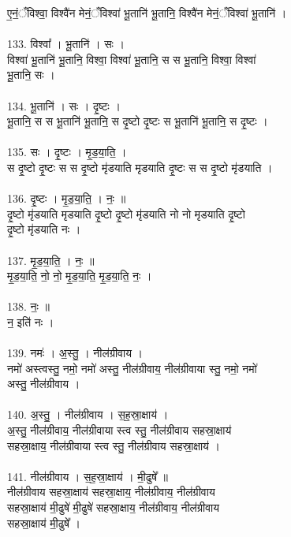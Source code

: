ए॒नं॒ँविश्वा॒ विश्वै॑न मेनं॒ँविश्वा॑ भू॒तानि॑ भू॒तानि॒ विश्वै॑न मेनं॒ँविश्वा॑ भू॒तानि॑ ।\\
\\
133. विश्वा᳚ । भू॒तानि॑ । सः ।\\
विश्वा॑ भू॒तानि॑ भू॒तानि॒ विश्वा॒ विश्वा॑ भू॒तानि॒ स स भू॒तानि॒ विश्वा॒ विश्वा॑\\
भू॒तानि॒ सः ।\\
\\
134. भू॒तानि॑ । सः । दृ॒ष्टः ।\\
भू॒तानि॒ स स भू॒तानि॑ भू॒तानि॒ स दृ॒ष्टो दृ॒ष्टः स भू॒तानि॑ भू॒तानि॒ स दृ॒ष्टः ।\\
\\
135. सः । दृ॒ष्टः । मृ॒ड॒या॒ति॒ ।\\
स दृ॒ष्टो दृ॒ष्टः स स दृ॒ष्टो मृ॑डयाति मृडयाति दृ॒ष्टः स स दृ॒ष्टो मृ॑डयाति ।\\
\\
136. दृ॒ष्टः । मृ॒ड॒या॒ति॒ । नः॒ ॥\\
दृ॒ष्टो मृ॑डयाति मृडयाति दृ॒ष्टो दृ॒ष्टो मृ॑डयाति नो नो मृडयाति दृ॒ष्टो\\
दृ॒ष्टो मृ॑डयाति नः ।\\
\\
137. मृ॒ड॒या॒ति॒ । नः॒ ॥\\
मृ॒ड॒या॒ति॒ नो॒ नो॒ मृ॒ड॒या॒ति॒ मृ॒ड॒या॒ति॒ नः॒ ।\\
\\
138. नः॒ ॥\\
न॒ इति॑ नः ।\\
\\
139. नमः॑ । अ॒स्तु॒ । नील॑ग्रीवाय ।\\
नमो॑ अस्त्वस्तु॒ नमो॒ नमो॑ अस्तु॒ नील॑ग्रीवाय॒ नील॑ग्रीवाया स्तु॒ नमो॒ नमो॑\\
अस्तु॒ नील॑ग्रीवाय ।\\
\\
140. अ॒स्तु॒ । नील॑ग्रीवाय । स॒ह॒स्रा॒क्षाय॑ ।\\
अ॒स्तु॒ नील॑ग्रीवाय॒ नील॑ग्रीवाया स्त्व स्तु॒ नील॑ग्रीवाय सहस्रा॒क्षाय॑\\
सहस्रा॒क्षाय॒ नील॑ग्रीवाया स्त्व स्तु॒ नील॑ग्रीवाय सहस्रा॒क्षाय॑ ।\\
\\
141. नील॑ग्रीवाय । स॒ह॒स्रा॒क्षाय॑ । मी॒ढुषे᳚ ॥\\
नील॑ग्रीवाय सहस्रा॒क्षाय॑ सहस्रा॒क्षाय॒ नील॑ग्रीवाय॒ नील॑ग्रीवाय\\
सहस्रा॒क्षाय॑ मी॒ढुषे॑ मी॒ढुषे॑ सहस्रा॒क्षाय॒ नील॑ग्रीवाय॒ नील॑ग्रीवाय\\
सहस्रा॒क्षाय॑ मी॒ढुषे᳚ ।\\
